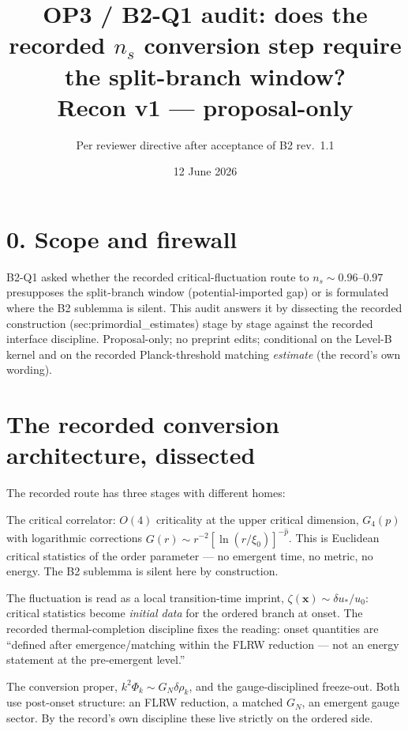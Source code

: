 \documentclass[11pt,a4paper]{article}
\title{\textbf{OP3 / B2-Q1 audit: does the recorded $n_s$ conversion step
require the split-branch window?}\\\large Recon v1 --- proposal-only}
\author{Per reviewer directive after acceptance of B2 rev.~1.1}
\date{12 June 2026}
\begin{document}
\maketitle

\section*{0. Scope and firewall}
B2-Q1 asked whether the recorded critical-fluctuation route to
$n_s\sim0.96$--$0.97$ presupposes the split-branch window (potential-imported
gap) or is formulated where the B2 sublemma is silent. This audit answers it
by dissecting the recorded construction (sec:primordial\_estimates) stage by
stage against the recorded interface discipline. Proposal-only; no preprint
edits; conditional on the Level-B kernel and on the recorded
Planck-threshold matching \emph{estimate} (the record's own wording).

\section{The recorded conversion architecture, dissected}
The recorded route has three stages with different homes:
\begin{description}[leftmargin=2.0em,itemsep=2pt]
\item[Stage 1 (pre-emergent).] The critical correlator: $O(4)$ criticality
at the upper critical dimension, $G_4(p)$ with logarithmic corrections
$G(r)\sim r^{-2}[\ln(r/\xi_0)]^{-\hat p}$. This is Euclidean critical
statistics of the order parameter --- no emergent time, no metric, no
energy. The B2 sublemma is silent here by construction.
\item[Stage 2 (hand-off at onset).] The fluctuation is read as a local
transition-time imprint, $\zeta(\mathbf x)\sim\delta u_*/u_0$: critical
statistics become \emph{initial data} for the ordered branch at onset. The
recorded thermal-completion discipline fixes the reading: onset quantities
are ``defined after emergence/matching within the FLRW reduction --- not an
energy statement at the pre-emergent level.''
\item[Stage 3 (post-onset).] The conversion proper,
$k^2\Phi_k\sim G_N\delta\rho_k$, and the gauge-disciplined freeze-out. Both
use post-onset structure: an FLRW reduction, a matched $G_N$, an emergent
gauge sector. By the record's own discipline these live strictly on the
ordered side.
\end{description}
\end{document}
